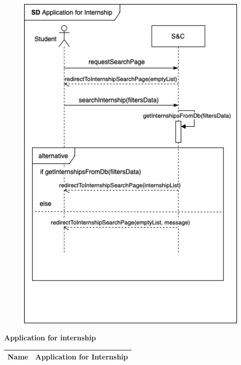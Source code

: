 \begin{enumerate}[label=\textbf{[US\arabic*]}, left = 0pt, align = left, resume]
                \newpage
                \begin{figure}[h!]
                \centering
                    \includegraphics[width=1\textwidth]{RASD/Images/UseCases/InternshipSearch.drawio.png}
                \label{fig:example}
                \end{figure}

            \newpage
            \item \textbf{Application for internship}
            
            \begin{longtable}{|l|p{11cm}|}  
                \hline
                \textbf{Name} & 
                    \textbf{Application for Internship} \\
                \hline
                

\end{longtable}
\end{enumerate}
